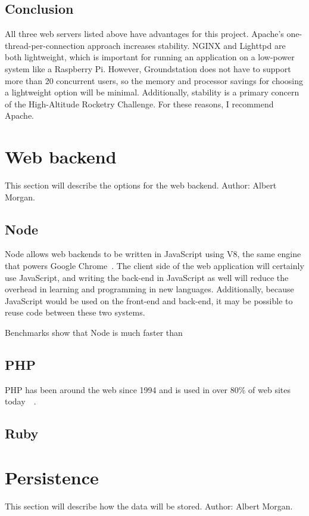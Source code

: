 \documentclass[10pt,draftclsnofoot,onecolumn]{IEEEtran}
\begin{document}
	\subsection{Conclusion}
	All three web servers listed above have advantages for this project.
	Apache's one-thread-per-connection approach increases stability.
	NGINX and Lighttpd are both lightweight, which is important for running an application on a low-power system like a Raspberry Pi.
	However, Groundstation does not have to support more than 20 concurrent users, so the memory and processor savings for choosing a lightweight option will be minimal.
	Additionally, stability is a primary concern of the High-Altitude Rocketry Challenge.
	For these reasons, I recommend Apache.


	\section{Web backend}
	This section will describe the options for the web backend. Author: Albert Morgan.
	
	\subsection{Node}
	Node allows web backends to be written in JavaScript using V8, the same engine that powers Google Chrome~\cite{node}.
	The client side of the web application will certainly use JavaScript, and writing the back-end  in JavaScript as well will reduce the overhead in learning and programming in new languages.
	Additionally, because JavaScript would be used on the front-end and back-end, it may be possible to reuse code between these two systems.
	
	Benchmarks show that Node is much faster than 
	
	\subsection{PHP}
	PHP has been around the web since 1994 and is used in over 80\% of web sites today~\cite{history-of-php}~\cite{usage-of-server-side-programming-languages-for-websites}.
	
	
	\subsection{Ruby}
	\section{Persistence}
	This section will describe how the data will be stored. Author: Albert Morgan.
\end{document}
